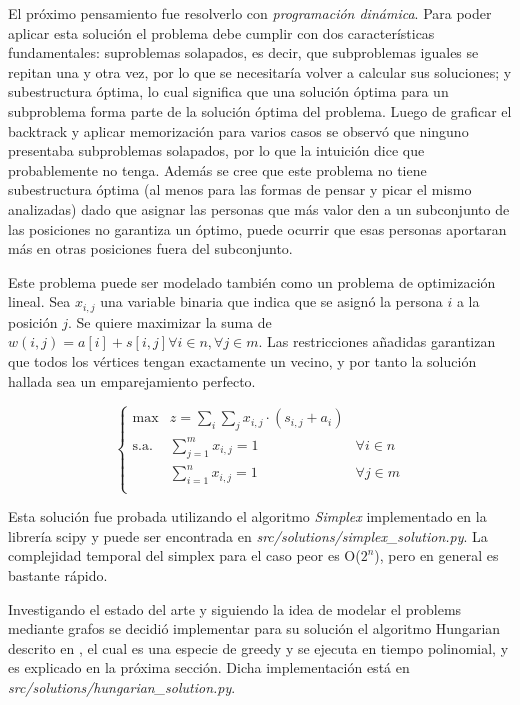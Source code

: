 \documentclass[10pt]{article} %
\begin{document}
	El pr\'oximo pensamiento fue resolverlo con \textit{programaci\'on din\'amica}. Para poder aplicar esta soluci\'on el problema debe cumplir con dos caracter\'isticas fundamentales: suproblemas solapados, es decir, que subproblemas iguales se repitan una y otra vez, por lo que se necesitar\'ia volver a calcular sus soluciones; y subestructura \'optima, lo cual significa que una soluci\'on \'optima para un subproblema forma parte de la soluci\'on \'optima del problema. Luego de graficar el backtrack y aplicar memorizaci\'on para varios casos se observ\'o que ninguno presentaba subproblemas solapados, por lo que la intuici\'on dice que probablemente no tenga.
	Adem\'as se cree que este problema no tiene subestructura \'optima (al menos para las formas de pensar y picar el mismo analizadas) dado que asignar las personas que m\'as valor den a un subconjunto de las posiciones no garantiza un \'optimo, puede ocurrir que esas personas aportaran m\'as en otras posiciones fuera del subconjunto. 
	
	Este problema puede ser modelado tambi\'en como un problema de optimizaci\'on lineal. Sea $ x_{i, j} $ una variable binaria que indica que se asign\'o la persona $ i $ a la posici\'on $ j $. Se quiere maximizar la suma de $ w(i, j) = a[i] + s[i, j] \forall i \in n, \forall j \in m $. Las restricciones a\~nadidas  garantizan que todos los v\'ertices tengan exactamente un vecino, y por tanto la soluci\'on hallada sea un emparejamiento perfecto. 
	
	\begin{equation} \left\{
	\begin{matrix}
		\max & \displaystyle z=\sum_{i}\sum_{j}x_{i,j}\cdot(s_{i,j} + a_{i}) \\
		\textrm{s.a.} & \sum_{j=1}^{m} x_{i, j} = 1 & \forall i \in n \\
		& \sum_{i=1}^{n} x_{i, j} = 1 & \forall j \in m \\ 
	\end{matrix} \right. 
	\end{equation} 

	Esta soluci\'on fue probada utilizando el algoritmo \textit{Simplex} implementado en la librer\'ia scipy y puede ser encontrada en \textit{src/solutions/simplex\_solution.py}. La complejidad temporal del simplex para el caso peor es O($ 2^{n} $), pero en general es bastante r\'apido.
	
	Investigando el estado del arte y siguiendo la idea de modelar el problems mediante grafos se decidi\'o implementar para su soluci\'on el algoritmo Hungarian descrito en \cite{introduction}, el cual es una especie de greedy y se ejecuta en tiempo polinomial, y es explicado en la pr\'oxima secci\'on. Dicha implementaci\'on est\'a en \textit{src/solutions/hungarian\_solution.py}.
	
\end{document}

